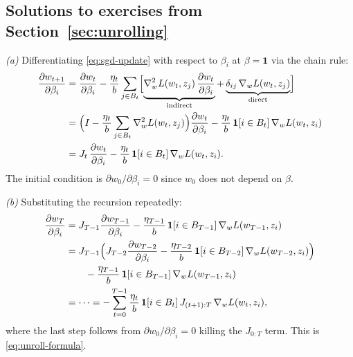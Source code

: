 \documentclass[11pt]{article}
\begin{document}
\begin{pdfonly}\begin{solutionsonly}
\subsection{Solutions to exercises from Section~\ref{sec:unrolling}}
\end{solutionsonly}\end{pdfonly}

\begin{solution}

\textit{(a)} Differentiating \eqref{eq:sgd-update} with respect to $\beta_i$ at $\beta = \mathbf{1}$ via the chain rule:
\begin{align*}
  \frac{\partial w_{t+1}}{\partial \beta_i} &= \frac{\partial w_t}{\partial \beta_i} - \frac{\eta_t}{b}\sum_{j\in B_t}\Bigl[\underbrace{\nabla_w^2 L(w_t,z_j)\,\frac{\partial w_t}{\partial \beta_i}}_{\text{indirect}} + \underbrace{\delta_{ij}\,\nabla_w L(w_t,z_j)}_{\text{direct}}\Bigr] \\
  &= \Bigl(I - \frac{\eta_t}{b}\sum_{j\in B_t}\nabla_w^2 L(w_t,z_j)\Bigr)\frac{\partial w_t}{\partial \beta_i} - \frac{\eta_t}{b}\,\mathbf{1}[i\in B_t]\,\nabla_w L(w_t,z_i) \\
  &= J_t\,\frac{\partial w_t}{\partial \beta_i} - \frac{\eta_t}{b}\,\mathbf{1}[i\in B_t]\,\nabla_w L(w_t,z_i).
\end{align*}
The initial condition is $\partial w_0/\partial \beta_i = 0$ since $w_0$ does not depend on $\beta$.

\textit{(b)} Substituting the recursion repeatedly:
\begin{align*}
  \frac{\partial w_T}{\partial \beta_i} &= J_{T-1}\frac{\partial w_{T-1}}{\partial \beta_i} - \frac{\eta_{T-1}}{b}\,\mathbf{1}[i\in B_{T-1}]\,\nabla_w L(w_{T-1},z_i) \\
  &= J_{T-1}\Bigl(J_{T-2}\frac{\partial w_{T-2}}{\partial \beta_i} - \frac{\eta_{T-2}}{b}\,\mathbf{1}[i\in B_{T-2}]\,\nabla_w L(w_{T-2},z_i)\Bigr) \\
  &\qquad - \frac{\eta_{T-1}}{b}\,\mathbf{1}[i\in B_{T-1}]\,\nabla_w L(w_{T-1},z_i) \\
  &= \cdots = -\sum_{t=0}^{T-1}\frac{\eta_t}{b}\,\mathbf{1}[i\in B_t]\,J_{(t+1):T}\,\nabla_w L(w_t,z_i),
\end{align*}
where the last step follows from $\partial w_0/\partial \beta_i = 0$ killing the $J_{0:T}$ term. This is \eqref{eq:unroll-formula}.


\end{solution}
\end{document}
